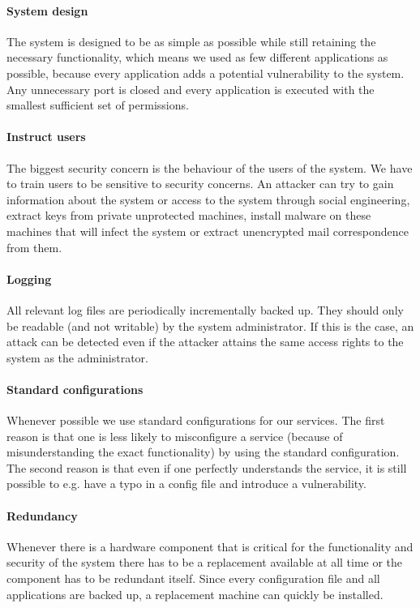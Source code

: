 \documentclass[english]{article}
\begin{document}

\paragraph{System design} The system is designed to be as simple as possible while still retaining the necessary functionality, which means we used as few different applications as possible, because every application adds a potential vulnerability to the system. Any unnecessary port is closed and every application is executed with the smallest sufficient set of permissions.

\paragraph{Instruct users} The biggest security concern is the behaviour of the users of the system. We have to train users to be sensitive to security concerns. An attacker can try to gain information about the system or access to the system through social engineering, extract keys from private unprotected machines, install malware on these machines that will infect the system or extract unencrypted mail correspondence from them.

\paragraph{Logging} All relevant log files are periodically incrementally backed up. They should only be readable (and not writable) by the system administrator. If this is the case, an attack can be detected even if the attacker attains the same access rights to the system as the administrator.

\paragraph{Standard configurations} Whenever possible we use standard configurations for our services. The first reason is that one is less likely to misconfigure a service (because of misunderstanding the exact functionality) by using the standard configuration. The second reason is that even if one perfectly understands the service, it is still possible to e.g. have a typo in a config file and introduce a vulnerability.

\paragraph{Redundancy} Whenever there is a hardware component that is critical for the functionality and security of the system there has to be a replacement available at all time or the component has to be redundant itself. Since every configuration file and all applications are backed up, a replacement machine can quickly be installed.
\end{document}
